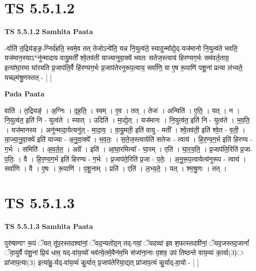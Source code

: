 \documentclass[17pt]{extarticle}
\begin{document}
\section*{ TS 5.5.1.2 }

\textbf{TS 5.5.1.2 } \newline
\textbf{Samhita Paata} \newline

-र्वाति॑ त॒द्रिय॑ङ्ङ॒-ग्निर्द॑हति॒ स्वमे॒व तत् तेजोऽन्वे॑ति॒ यन्न नि॒युत्व॑ते॒ स्यादुन्मा᳚द्ये॒द्-यज॑मानो नि॒युत्व॑ते भवति॒ यज॑मान॒स्याऽ*नु॑न्मादाय वायु॒मती᳚ श्वे॒तव॑ती याज्यानुवा॒क्ये॑ भवतः सतेज॒स्त्वाय॑ हिरण्यग॒र्भः सम॑वर्त॒ताग्र॒ इत्या॑घा॒रमा घा॑रयति प्र॒जाप॑ति॒र्वै हि॑रण्यग॒र्भः प्र॒जाप॑तेरनुरूप॒त्वाय॒ सर्वा॑णि॒ वा ए॒ष रू॒पाणि॑ पशू॒नां प्रत्या ल॑भ्यते॒ यच्छ्म॑श्रु॒णस्तत् - [  ] \newline

\textbf{Pada Paata} \newline

वाति॑ । त॒द्रियङ्॑ । अ॒ग्निः । द॒ह॒ति॒ । स्वम् । ए॒व । तत् । तेजः॑ । अन्विति॑ । ए॒ति॒ । यत् । न । नि॒युत्व॑त॒ इति॑ नि - युत्व॑ते । स्यात् । उदिति॑ । मा॒द्ये॒त् । यज॑मानः । नि॒युत्व॑त॒ इति॑ नि - युत्व॑ते । भ॒व॒ति॒ । यज॑मानस्य । अनु॑न्मादा॒येत्यनु॑त् - मा॒दा॒य॒ । वा॒यु॒मती॒ इति॑ वायु - मती᳚ । श्वे॒तव॑ती॒ इति॑ श्वे॒त - व॒ती॒ । या॒ज्या॒नु॒वा॒क्ये॑ इति॑ याज्या - अ॒नु॒वा॒क्ये᳚ । भ॒व॒तः॒ । स॒ते॒ज॒स्त्वायेति॑ सतेजः - त्वाय॑ । हि॒र॒ण्य॒ग॒र्भ इति॑ हिरण्य - ग॒र्भः । समिति॑ । अ॒व॒र्त॒त॒ । अग्रे᳚ । इति॑ । आ॒घा॒रमित्या᳚ - घा॒रम् । एति॑ । घा॒र॒य॒ति॒ । प्र॒जाप॑ति॒रिति॑ प्र॒जा-प॒तिः॒ । वै । हि॒र॒ण्य॒ग॒र्भ इति॑ हिरण्य - ग॒र्भः । प्र॒जाप॑ते॒रिति॑ प्र॒जा - प॒तेः॒ । अ॒नु॒रू॒प॒त्वायेत्य॑नुरूप - त्वाय॑ । सर्वा॑णि । वै । ए॒षः । रू॒पाणि॑ । प॒शू॒नाम् । प्रति॑ । एति॑ । ल॒भ्य॒ते॒ । यत् । श्म॒श्रु॒णः । तत् ।  \newline




\section*{ TS 5.5.1.3 }

\textbf{TS 5.5.1.3 } \newline
\textbf{Samhita Paata} \newline

पुरु॑षाणाꣳ रू॒पं ॅयत् तू॑प॒रस्तदश्वा॑नां॒ ॅयद॒न्यतो॑द॒न् तद्-गवां॒ ॅयदव्या॑ इव श॒फास्तदवी॑नां॒ ॅयद॒जस्तद॒जानां᳚ ॅवा॒युर्वै प॑शू॒नां प्रि॒यं धाम॒ यद्-वा॑य॒व्यो॑ भव॑त्ये॒तमे॒वैन॑म॒भि स॑जांना॒नाः प॒शव॒ उप॑ तिष्ठन्ते वाय॒व्यः॑ का॒र्या(3)ः प्रा॑जाप॒त्या(3) इत्या॑हु॒-र्यद्-वा॑य॒व्यं॑ कु॒र्यात् प्र॒जाप॑तेरिया॒द्यत् प्रा॑जाप॒त्यं कु॒र्याद्-वा॒यो - [  ] \newline
\end{document}
